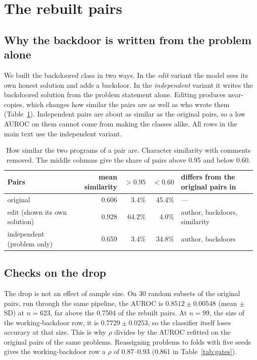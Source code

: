 \documentclass{article}
\newcommand{\three}[1]{\num[round-mode=places,round-precision=3]{#1}}
\newcommand{\simStored}{0.606}
\newcommand{\simStoredHigh}{3.4\%}
\newcommand{\simStoredLow}{45.4\%}
\newcommand{\simEdit}{0.928}
\newcommand{\simEditHigh}{64.2\%}
\newcommand{\simEditLow}{4.0\%}
\newcommand{\simIndep}{0.659}
\newcommand{\simIndepHigh}{3.4\%}
\newcommand{\simIndepLow}{34.8\%}
\newcommand{\sameGenS}{0.7504}
\newcommand{\sameGenN}{623}
\newcommand{\curveHeadline}{0.8512}
\newcommand{\curveHeadlineSd}{0.00548}
\newcommand{\strictN}{99}
\newcommand{\strictRho}{0.861}
\newcommand{\strictRhoSeeds}{0.87--0.93}
\newcommand{\curveStrict}{0.7729}
\newcommand{\curveStrictSd}{0.0253}
\begin{document}
\FloatBarrier
\section{The rebuilt pairs}
\label{app:rebuilt}

\subsection{Why the backdoor is written from the problem alone}
\label{app:pairsim}
We built the backdoored class in two ways. In the \emph{edit} variant the model sees its own honest
solution and adds a backdoor. In the \emph{independent} variant it writes the backdoored solution
from the problem statement alone. Editing produces near-copies, which changes how similar the pairs
are as well as who wrote them (Table~\ref{tab:similarity}). Independent pairs are about as similar
as the original pairs, so a low AUROC on them cannot come from making the classes alike. All rows in
the main text use the independent variant.

\begin{table}[!htbp]\centering\footnotesize
\setlength{\tabcolsep}{5pt}
\caption{How similar the two programs of a pair are. Character similarity with comments
removed. The middle columns give the share of pairs above 0.95 and below 0.60.}
\label{tab:similarity}
\begin{tabular}{@{}l r r r l@{}}
\toprule
Pairs & mean similarity & $>0.95$ & $<0.60$ & differs from the original pairs in \\
\midrule
original & \simStored{} & \simStoredHigh{} & \simStoredLow{} & --- \\
edit (shown its own solution) & \simEdit{} & \simEditHigh{} & \simEditLow{} & author, backdoors, similarity \\
independent (problem only) & \simIndep{} & \simIndepHigh{} & \simIndepLow{} & author, backdoors \\
\bottomrule
\end{tabular}
\end{table}

\subsection{Checks on the drop}
\label{app:robust}
The drop is not an effect of sample size. On 30 random subsets of the original pairs, run through the same
pipeline, the AUROC is $\three{\curveHeadline} \pm \three{\curveHeadlineSd}$ (mean $\pm$ SD) at
$n = \sameGenN{}$, far above the \three{\sameGenS} of the rebuilt pairs. At $n = \strictN{}$, the
size of the working-backdoor row, it is $\three{\curveStrict} \pm \three{\curveStrictSd}$, so the
classifier itself loses accuracy at that size. This is why $\rho$ divides by the AUROC refitted on
the original pairs of the same problems. Reassigning problems to folds with five seeds gives the
working-backdoor row a $\rho$ of \strictRhoSeeds{} (\strictRho{} in Table~\ref{tab:gates}).
\end{document}
